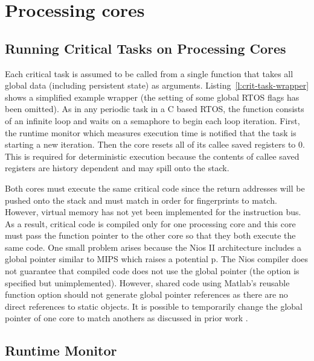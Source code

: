 \section{Processing cores}
\label{s:proc-cores}
\subsection{Running Critical Tasks on Processing Cores}

	Each critical task is assumed to be called from a single function that takes all global data (including persistent state) as arguments. 
	Listing~\ref{l:crit-task-wrapper} shows a simplified example wrapper (the setting of some global RTOS flags has been omitted). 
	As in any periodic task in a C based RTOS, the function consists of an infinite loop and waits on a semaphore to begin each loop iteration. 
	First, the runtime monitor which measures execution time is notified that the task is starting a new iteration. 
	Then the core resets all of its callee saved registers to 0. 
	This is required for deterministic execution because the contents of callee saved registers are history dependent and may spill onto the stack. 


	Both cores must execute the same critical code since the return addresses will be pushed onto the stack and must match in order for fingerprints to match. 
	However, virtual memory has not yet been implemented for the instruction bus. 
	As a result, critical code is compiled only for one processing core and this core must pass the function pointer to the other core so that they both execute the same code. 
	One small problem arises because the Nios II architecture includes a global pointer similar to MIPS which raises a potential p.
	The Nios compiler does not guarantee that compiled code does not use the global pointer (the option is specified but unimplemented). 
	However, shared code using Matlab's reusable function option should not generate global pointer references as there are no direct references to static objects. 
	It is possible to temporarily change the global pointer of one core to match anothers as discussed in prior work \cite{ugthesis}.


\subsection{Runtime Monitor}

